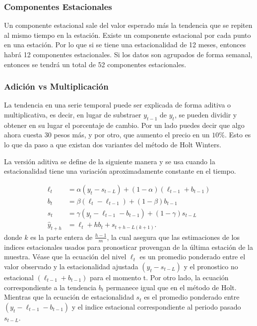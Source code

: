 \documentclass[12pt,letterpaper]{article}
\begin{document}
\subsubsection{Componentes Estacionales}
Un componente estacional sale del valor esperado más la tendencia que se repiten al mismo tiempo en la estación. Existe un componente estacional por cada punto en una estación. Por lo que si se tiene una estacionalidad de 12 meses, entonces habrá 12 componentes estacionales. Si los datos son agrupados de forma semanal, entonces se tendrá un total de 52 componentes estacionales. \cite{grisha-triple-exp}

\subsubsection{Adición vs Multiplicación}
La tendencia en una serie temporal puede ser explicada de forma aditiva o multiplicativa, es decir, en lugar de substraer $y_{t-1}$ de $y_{t}$, se pueden dividir y obtener en su lugar el porcentaje de cambio. Por un lado puedes decir que algo ahora cuesta 30 pesos más, y por otro, que aumento el precio en un $10\%$. Esto es lo que da paso a que existan dos variantes del método de Holt Winters.

La versión aditiva se define de la siguiente manera y se usa cuando la estacionalidad tiene una variación aproximadamente constante en el tiempo.

\begin{align}
    \ell_t &= \alpha(y_t - s_{t-L}) + (1-\alpha)(\ell_{t-1}+b_{t-1})\\
    b_t &= \beta(\ell_t - \ell_{t-1})+(1-\beta)b_{t-1}\\
    s_t &= \gamma(y_t - \ell_{t-1} - b_{t-1})+(1-\gamma)s_{t-L}\\
    \hat{y}_{t+h} &= \ell_t + hb_t + s_{t+h-L(k+1)}.
\end{align}
donde $k$ es la parte entera de $\frac{h-1}{m}$, la cual asegura que las estimaciones de los indices estacionales usados para pronosticar provengan de la última estación de la muestra. Véase que la ecuación del nivel $\ell_t$ es un promedio ponderado entre el valor observado y la estacionalidad ajustada $(y_t-s_{t-L})$ y el pronostico no estacional $(\ell_{t-1}+b_{t-1})$ para el momento t. Por otro lado, la ecuación correspondiente a la tendencia $b_t$ permanece igual que en el método de Holt. Mientras que la ecuación de estacionalidad $s_t$ es el promedio ponderado entre $(y_t-\ell_{t-1}-b_{t-1})$ y el indice estacional correspondiente al periodo pasado $s_{t-L}$. \cite{hyndman2018forecasting}
\end{document}
